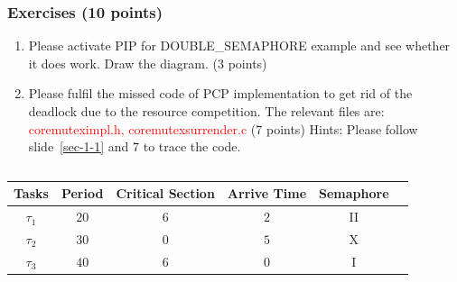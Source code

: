 \documentclass[t]{beamer}
\newcommand{\red}[1]{\textcolor{red}{#1}}
\begin{document}
\begin{frame}
\frametitle{Exercises (10 points)}
\begin{enumerate}
\item Please activate PIP for DOUBLE\_SEMAPHORE example and see whether it does work. Draw the diagram. (3 points)
\item Please fulfil the missed code of PCP implementation to get rid of the deadlock due to the resource competition. The relevant files are: \red{coremuteximpl.h, coremutexsurrender.c} (7 points)\newline
Hints: Please follow slide~\ref{sec-1-1} and 7 to trace the code. 
\end{enumerate}
\begin{columns}
    \column{\textwidth}
  \begin{table}
    \centering
    \begin{tabular}{|c|c|c|c|c|c|}
      \hline
     Tasks & Period & Critical Section & Arrive Time & Semaphore\\
     \hline
     $\tau_1$ & $20$ & $6$ & $2$ & II\\
     \hline
     $\tau_2$ & $30$ & $0$ & $5$ & X\\
     \hline
     $\tau_3$ & $40$ & $6$ & $0$ & I\\
     \hline
    \end{tabular}
  \end{table}
  \end{columns}
\end{frame}
\end{document}
